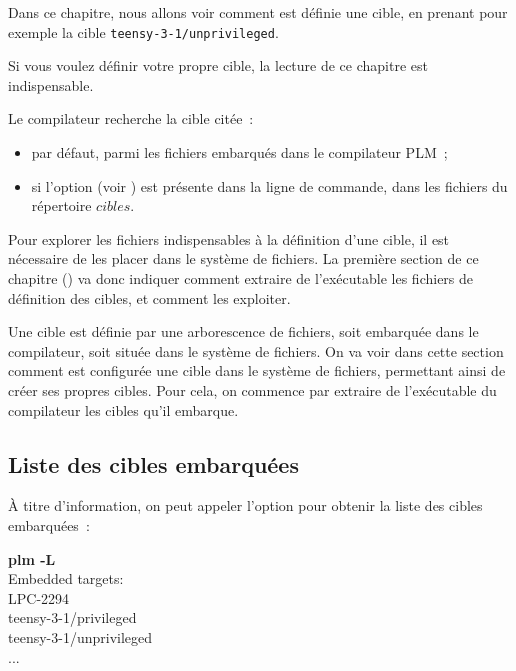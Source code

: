 





Dans ce chapitre, nous allons voir comment est définie une cible, en prenant pour exemple la cible \texttt{teensy-3-1/unprivileged}. 

Si vous voulez définir votre propre cible, la lecture de ce chapitre est indispensable. 

Le compilateur recherche la cible citée~:
\begin{itemize}
  \item par défaut, parmi les fichiers embarqués dans le compilateur PLM~;
  \item si l'option  (voir ) est présente dans la ligne de commande, dans les fichiers du répertoire $cibles$.
\end{itemize}

Pour explorer les fichiers indispensables à la définition d'une cible, il est nécessaire de les placer dans le système de fichiers. La première section de ce chapitre () va donc indiquer comment extraire de l'exécutable les fichiers de définition des cibles, et comment les exploiter.



Une cible est définie par une arborescence de fichiers, soit embarquée dans le compilateur, soit située dans le système de fichiers. On va voir dans cette section comment est configurée une cible dans le système de fichiers, permettant ainsi de créer ses propres cibles. Pour cela, on commence par extraire de l'exécutable du compilateur les cibles qu'il embarque.

\subsection{Liste des cibles embarquées}
À titre d'information, on peut appeler l'option  pour obtenir la liste des cibles embarquées~:
\begin{SHELL}
{\bfseries plm -L}\\
Embedded targets:\\ 
\hspace*{1.2em}LPC-2294\\
\hspace*{1.2em}teensy-3-1/privileged\\
\hspace*{1.2em}teensy-3-1/unprivileged\\
\hspace*{1.2em}...
\end{SHELL}

